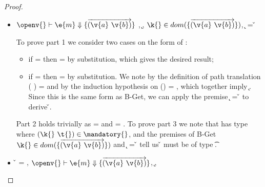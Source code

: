 \begin{lemma}
\begin{enumerate}
\begin{proof}
\begin{case}[T-GetHMap]
  \begin{itemize}
    \item[]
      \begin{subcase}[B-Get]
        $\opsem {\openv{}}
        {\e{m}} {\curlymap{\overrightarrow{({\v{a}}\ {\v{b}})}}}$
        ,
         \opsem {\openv{}}
                 {} {\k{}},
         $\keyinmap{\k{}}{\curlymap{\overrightarrow{({\v{a}}\ {\v{b}})}}}$,
          {\k{}} = {\v{}}

         To prove part 1 we consider two cases on the form of : 
         \begin{itemize}
           \item
         if {} = \emptyobject{}
         then \object{} = \emptyobject{} by substitution, which gives the desired result;
           \item
         if  = { {}}
         then \object{} = { {}} by substitution.
         We note by the definition of path translation
         {\openv{}}({ {}}) =
         {}
         and by the induction hypothesis on 
         {{\openv{}}()} = {},
         which together imply 
         \inopenv {\openv{}} {\object{}} { {\k{}}}.
         Since this is the same form as B-Get, we can apply the premise
          {\k{}} = {\v{}}
         to derive \inopenv {\openv{}} {\object{}} {\v{}}.
         \end{itemize}
         
         Part 2 holds trivially as \thenprop{\prop{}} = {\topprop{}}
         and \elseprop{\prop{}} = {\topprop{}}.
         To prove part 3 we note that  has type {\HMapgeneric {\mandatory{}} {\absent{}}}
         where ${\inmandatory{\k{}}{\t{}}{\mandatory{}}}$, and 
         the premises of B-Get
         $\keyinmap{\k{}}{\curlymap{\overrightarrow{({\v{a}}\ {\v{b}})}}}$
         and
          {\k{}} = {\v{}}
         tell us {\v{}} must be of type {\t{}}.

      \end{subcase}
    \item[]
      \begin{subcase}[B-GetMissing]
        \v{} = \nil,
        $\opsem {\openv{}}
        {\e{m}} {\curlymap{\overrightarrow{({\v{a}}\ {\v{b}})}}}$,
       \opsem {\openv{}} {} {\k{}},


\end{subcase}
\end{itemize}
\end{case}
\end{proof}
\end{enumerate}
\end{lemma}

